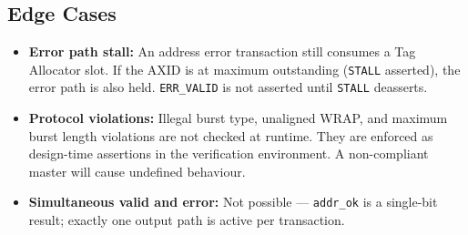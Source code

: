 \subsection{Edge Cases}

\begin{itemize}
  \item \textbf{Error path stall:} An address error transaction still
        consumes a Tag Allocator slot. If the AXID is at maximum
        outstanding (\texttt{STALL} asserted), the error path is also
        held. \texttt{ERR\_VALID} is not asserted until \texttt{STALL}
        deasserts.
  \item \textbf{Protocol violations:} Illegal burst type, unaligned
        WRAP, and maximum burst length violations are not checked at
        runtime. They are enforced as design-time assertions in the
        verification environment. A non-compliant master will cause
        undefined behaviour.
  \item \textbf{Simultaneous valid and error:} Not possible —
        \texttt{addr\_ok} is a single-bit result; exactly one output
        path is active per transaction.
\end{itemize}